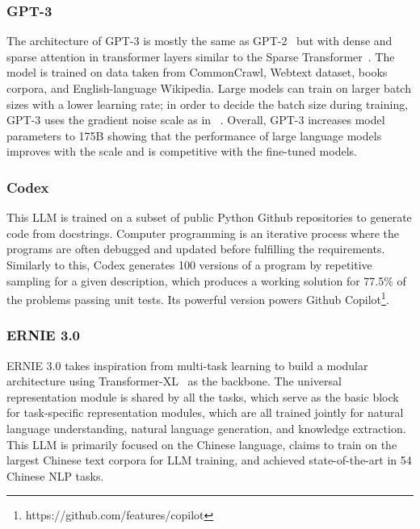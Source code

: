 \subsubsection{GPT-3}
The architecture of GPT-3 is mostly the same as GPT-2~\cite{GPT-2} but with dense and sparse attention in transformer layers similar to the Sparse Transformer~\cite{sparse_transformer}. The model is trained on data taken from CommonCrawl, Webtext dataset, books corpora, and English-language Wikipedia. Large models can train on larger batch sizes with a lower learning rate; in order to decide the batch size during training, GPT-3 uses the gradient noise scale as in ~\cite{batch_size_selec}. Overall, GPT-3 increases model parameters to 175B showing that the performance of large language models improves with the scale and is competitive with the fine-tuned models.  

\subsubsection{Codex~\cite{codex}}
This LLM is trained on a subset of public Python Github repositories to generate code from docstrings. Computer programming is an iterative process where the programs are often debugged and updated before fulfilling the requirements. Similarly to this, Codex generates 100 versions of a program by repetitive sampling for a given description, which produces a working solution for 77.5\% of the problems passing unit tests.  Its powerful version powers Github Copilot\footnote{https://github.com/features/copilot}.  

\subsubsection{ERNIE 3.0~\cite{ernie3}}
ERNIE 3.0 takes inspiration from multi-task learning to build a modular architecture using Transformer-XL~\cite{dai2019transformer} as the backbone. The universal representation module is shared by all the tasks, which serve as the basic block for task-specific representation modules, which are all trained jointly for natural language understanding, natural language generation, and knowledge extraction. This LLM is primarily focused on the Chinese language, claims to train on the largest Chinese text corpora for LLM training, and achieved state-of-the-art in 54 Chinese NLP tasks.

